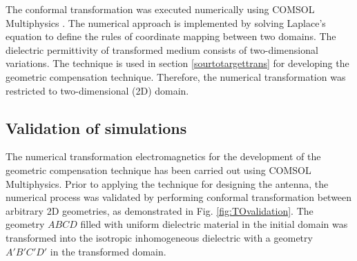 The conformal transformation was executed numerically using COMSOL Multiphysics \cite{Ma2010}. The numerical approach is implemented by solving Laplace's equation to define the rules of coordinate mapping between two domains. The dielectric permittivity of transformed medium consists of two-dimensional variations. The technique is used in section \ref{sourtotargettrans} for developing the geometric compensation technique. Therefore, the numerical transformation was restricted to two-dimensional (2D) domain.

\subsection{Validation of simulations}
\label{App:TO}

The numerical transformation electromagnetics for the development of the geometric compensation technique has been carried out using COMSOL Multiphysics. Prior to applying the technique for designing the antenna, the numerical process was validated by performing conformal transformation between arbitrary 2D geometries, as demonstrated in Fig. \ref{fig:TOvalidation}. The geometry $ABCD$ filled with uniform dielectric material in the initial domain was transformed into the isotropic inhomogeneous dielectric with a geometry $A'B'C'D'$ in the transformed domain.

